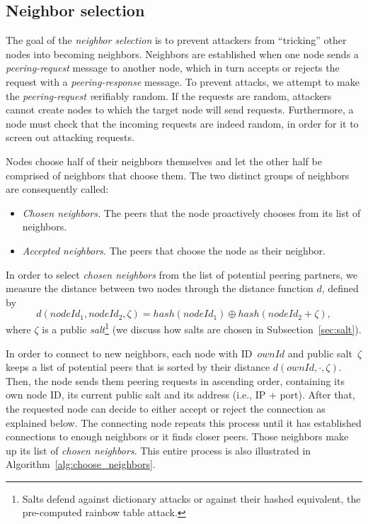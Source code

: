 \documentclass[../main.tex]{subfiles}
\begin{document}
\subsection{Neighbor selection}

The goal of the \emph{neighbor selection} is to prevent attackers from \enquote{tricking} other nodes into becoming neighbors.  Neighbors are established when one node sends a \emph{peering-request} message to another node, which in turn accepts or rejects the request with a \emph{peering-response} message. 
%
To prevent attacks, we attempt to make the \emph{peering-request} {\textit verifiably random}.  If the requests are random, attackers cannot create nodes to which the target node will send requests.  Furthermore, a node must check that the incoming requests are indeed random, in order for it to screen out attacking requests.  

Nodes choose half of their neighbors themselves and let the other half be comprised of neighbors that choose them. The two distinct groups of neighbors are consequently called:

\begin{itemize}
    \item \textit{Chosen neighbors.} The peers that the node proactively chooses from its list of neighbors.
    \item \textit{Accepted neighbors.} The peers that choose the node as their neighbor.
\end{itemize}

In order to select \emph{chosen neighbors} from the list of potential peering partners, we measure the distance between two nodes through the distance function $d$, defined by 
\begin{equation*}\label{eq:salted_distance}
    d(nodeId_1, nodeId_2, \zeta) = hash(nodeId_1 ) \oplus hash(nodeId_2+ \zeta),
\end{equation*}
where $\zeta$ is a public \textit{salt}\footnote{Salts defend against dictionary attacks or against their hashed equivalent, the pre-computed rainbow table attack.} (we discuss how salts are chosen in Subsection~\ref{sec:salt}).

In order to connect to new neighbors, each node with ID~$ownId$ and public salt~$\zeta$ keeps a list of potential peers that is sorted by their distance $d(ownId, \cdot, \zeta)$.
Then, the node sends them peering requests in ascending order, containing its own node ID, its current public salt and its address (i.e., IP + port).
After that, the requested node can decide to either accept or reject the connection as explained below.
The connecting node repeats this process until it has established connections to enough neighbors or it finds closer peers.
Those neighbors make up its list of \emph{chosen neighbors}.
This entire process is also illustrated in Algorithm~\ref{alg:choose_neighbors}.
\end{document}
